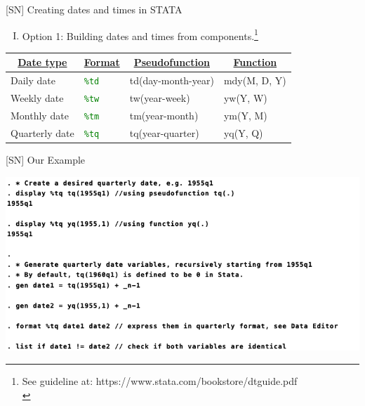 \documentclass[
  10pt,
  ignorenonframetext,
]{beamer}
\providecommand{\tightlist}{%
  \setlength{\itemsep}{0pt}\setlength{\parskip}{0pt}}
\begin{document}
\begin{frame}{{[}SN{]} Creating dates and times in STATA}
\protect\hypertarget{sn-creating-dates-and-times-in-stata}{}
\begin{enumerate}
[(I)]
\tightlist
\item
  Option 1: Building dates and times from
  components.\footnote[frame]{See guideline at: https://www.stata.com/bookstore/dtguide.pdf \\}
\end{enumerate}

\begin{table}[]
\begin{tabular}{@{}llll@{}}
\toprule
\multicolumn{1}{c}{{\ul \textbf{Date type}}} &
  \multicolumn{1}{c}{{\ul \textbf{Format}}} &
  \multicolumn{1}{c}{{\ul \textbf{Pseudofunction}}} &
  \multicolumn{1}{c}{{\ul \textbf{Function}}} \\ \midrule
Daily date     & {\textcolor{green}{\texttt{\%td}}} & td(day-month-year) & mdy(M, D, Y) \\
Weekly date    & {\textcolor{green}{\texttt{\%tw}}} & tw(year-week)      & yw(Y, W)     \\
Monthly date   & {\textcolor{green}{\texttt{\%tm}}} & tm(year-month)     & ym(Y, M)     \\
Quarterly date & {\textcolor{green}{\texttt{\%tq}}} & tq(year-quarter)   & yq(Y, Q)     \\ \bottomrule
\end{tabular}
\end{table}
\end{frame}

\begin{frame}{{[}SN{]} Our Example}
\protect\hypertarget{sn-our-example-1}{}
\begin{flushleft}\includegraphics[width=1\linewidth]{pictures/S2-GenDate-Opt1} \end{flushleft}
\end{frame}
\end{document}
